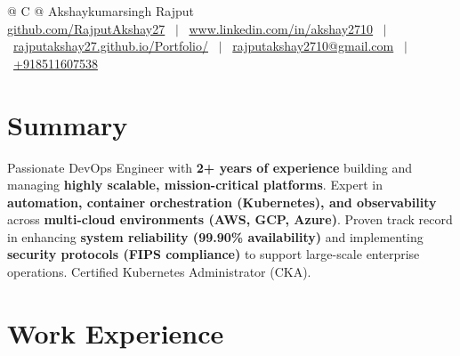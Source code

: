 \documentclass[a4paper,10pt]{article}
\begin{document}
\pagestyle{empty} 

\begin{tabularx}{\linewidth}{@{} C @{}}
\Huge{Akshaykumarsingh Rajput} \\ [7.0pt]
\href{https://github.com/RajputAkshay27}{github.com/RajputAkshay27} \ $|$ \ \href{https://www.linkedin.com/in/akshay2710}{www.linkedin.com/in/akshay2710} \ $|$ \ \href{https://rajputakshay27.github.io/Portfolio/}{rajputakshay27.github.io/Portfolio/} \ $|$ \ \href{mailto:rajputakshay2710@gmail.com}{rajputakshay2710@gmail.com} \ $|$ \ \href{tel:+918511607538}{+918511607538} \\
\end{tabularx}

\section{Summary}
Passionate DevOps Engineer with \textbf{2+ years of experience} building and managing \textbf{highly scalable, mission-critical platforms}. Expert in \textbf{automation, container orchestration (Kubernetes), and observability} across \textbf{multi-cloud environments (AWS, GCP, Azure)}. Proven track record in enhancing \textbf{system reliability (99.90\% availability)} and implementing \textbf{security protocols (FIPS compliance)} to support large-scale enterprise operations. Certified Kubernetes Administrator (CKA).

\section{Work Experience}
\end{document}
